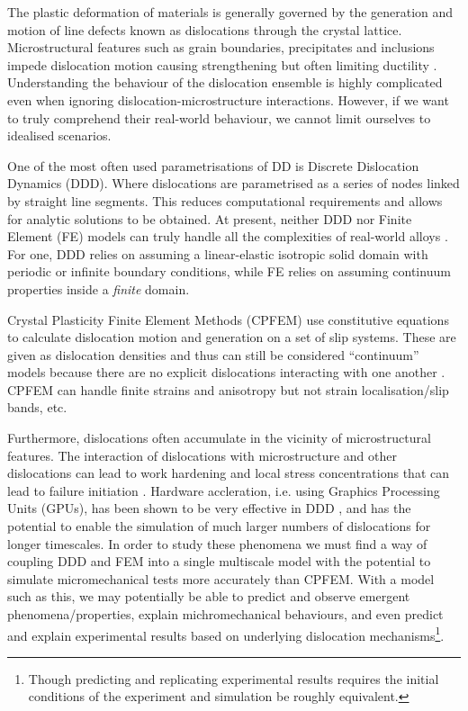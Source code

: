 The plastic deformation of materials is generally governed by the generation and motion of line defects known as dislocations through the crystal lattice. Microstructural features such as grain boundaries, precipitates and inclusions impede dislocation motion causing strengthening but often limiting ductility \cite{init_fail_dln}. Understanding the behaviour of the dislocation ensemble is highly complicated even when ignoring dislocation-microstructure interactions. However, if we want to truly comprehend their real-world behaviour, we cannot limit ourselves to idealised scenarios.

One of the most often used parametrisations of DD is Discrete Dislocation Dynamics (DDD). Where dislocations are parametrised as a series of nodes linked by straight line segments. This reduces computational requirements and allows for analytic solutions to be obtained. At present, neither DDD nor Finite Element (FE) models can truly handle all the complexities of real-world alloys \cite{ddd_fem1, paradis, fem_ddd2, fem_ddd}. For one, DDD relies on assuming a linear-elastic isotropic solid domain with periodic or infinite boundary conditions, while FE relies on assuming continuum properties inside a \emph{finite} domain.

Crystal Plasticity Finite Element Methods (CPFEM) use constitutive equations to calculate dislocation motion and generation on a set of slip systems. These are given as dislocation densities and thus can still be considered ``continuum'' models because there are no explicit dislocations interacting with one another \cite{cpfem1}. CPFEM can handle finite strains and anisotropy but not strain localisation/slip bands, etc.

Furthermore, dislocations often accumulate in the vicinity of microstructural features. The interaction of dislocations with microstructure and other dislocations can lead to work hardening and local stress concentrations that can lead to failure initiation \cite{size_effects, dln_ind_hard}. Hardware accleration, i.e. using Graphics Processing Units (GPUs), has been shown to be very effective in DDD \cite{gpu_ddd}, and has the potential to enable the simulation of much larger numbers of dislocations for longer timescales. In order to study these phenomena we must find a way of coupling DDD and FEM into a single multiscale model with the potential to simulate micromechanical tests more accurately than CPFEM. With a model such as this, we may potentially be able to predict and observe emergent phenomena/properties, explain michromechanical behaviours, and even predict and explain experimental results based on underlying dislocation mechanisms\footnote{Though predicting and replicating experimental results requires the initial conditions of the experiment and simulation be roughly equivalent.}.

